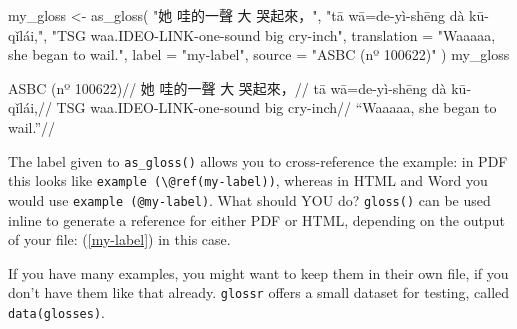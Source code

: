 \documentclass[
]{article}
\newenvironment{Shaded}{\begin{snugshade}}{\end{snugshade}}
\newcommand{\AttributeTok}[1]{\textcolor[rgb]{0.77,0.63,0.00}{#1}}
\newcommand{\FunctionTok}[1]{\textcolor[rgb]{0.00,0.00,0.00}{#1}}
\newcommand{\NormalTok}[1]{#1}
\newcommand{\OtherTok}[1]{\textcolor[rgb]{0.56,0.35,0.01}{#1}}
\newcommand{\StringTok}[1]{\textcolor[rgb]{0.31,0.60,0.02}{#1}}
\begin{document}
\begin{Shaded}
\begin{Highlighting}[]
\NormalTok{my\_gloss }\OtherTok{\textless{}{-}} \FunctionTok{as\_gloss}\NormalTok{(}
  \StringTok{"她 哇的一聲 大 哭起來，"}\NormalTok{,}
  \StringTok{"tā wā=de{-}yì{-}shēng dà kū{-}qǐlái,"}\NormalTok{,}
  \StringTok{"TSG waa.IDEO{-}LINK{-}one{-}sound big cry{-}inch"}\NormalTok{,}
  \AttributeTok{translation =} \StringTok{"Waaaaa, she began to wail."}\NormalTok{,}
  \AttributeTok{label =} \StringTok{"my{-}label"}\NormalTok{,}
  \AttributeTok{source =} \StringTok{"ASBC (nº 100622)"}
\NormalTok{)}
\NormalTok{my\_gloss}
\end{Highlighting}
\end{Shaded}

\ex\label{my-label} \begingl \glpreamble ASBC (nº 100622)// \gla 她 哇的一聲 大 哭起來，// \glb tā wā=de-yì-shēng dà kū-qǐlái,// \glc TSG waa.IDEO-LINK-one-sound big cry-inch// \glft ``Waaaaa, she began to wail.''//
\endgl \xe 

The label given to \texttt{as\_gloss()} allows you to cross-reference the example: in PDF this looks like \texttt{example\ (\textbackslash{}@ref(my-label))}, whereas in HTML and Word you would use \texttt{example\ (@my-label)}. What should YOU do? \texttt{gloss()} can be used inline to generate a reference for either PDF or HTML, depending on the output of your file: (\ref{my-label}) in this case.

If you have many examples, you might want to keep them in their own file, if you don't have them like that already. \texttt{glossr} offers a small dataset for testing, called \texttt{data(glosses)}.
\end{document}
